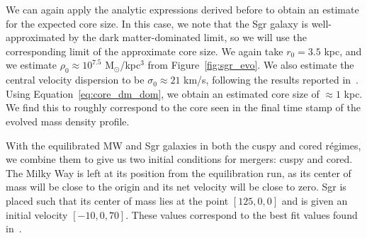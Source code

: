 We can again apply the analytic expressions derived before to obtain an
estimate for the expected core size.  In this case, we note that the Sgr
galaxy is well-approximated by the dark matter-dominated limit, so we will use
the corresponding limit of the approximate core size.  We again take $r_0 =
3.5$ kpc, and we estimate $\rho_0 \approx 10^{7.5}$ M$_\odot$/kpc$^3$ from
Figure~\ref{fig:sgr_evo}.  We also estimate the central velocity dispersion to
be $\sigma_0 \approx 21$ km/s, following the results reported
in~\cite{jiang_orbit_2000}.  Using Equation~\ref{eq:core_dm_dom}, we obtain an
estimated core size of $\approx 1$ kpc.  We find this to roughly correspond to
the core seen in the final time stamp of the evolved mass density profile.

With the equilibrated MW and Sgr galaxies in both the cuspy and cored régimes,
we combine them to give us two initial conditions for mergers: cuspy and
cored. The Milky Way is left at its position from the equilibration run, as
its center of mass will be close to the origin and its net velocity will be
close to zero. Sgr is placed such that its center of mass lies at the point
\([125, 0, 0]\) and is given an initial velocity \([-10,0,70]\).  These values
correspond to the best fit values found in~\cite{dierickx_predicted_2017}.
